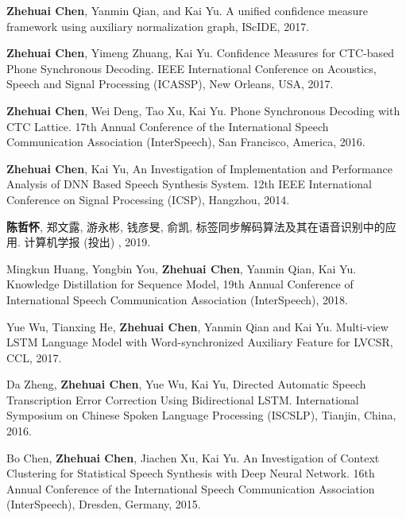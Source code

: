 \begin{publications}{99}
 \item {\bf Zhehuai Chen}, Yanmin Qian, and Kai Yu. A unified confidence measure framework using auxiliary normalization graph, IScIDE, 2017.
 \item {\bf Zhehuai Chen}, Yimeng Zhuang, Kai Yu. Confidence Measures for CTC-based Phone Synchronous Decoding. IEEE International Conference on Acoustics, Speech and Signal Processing (ICASSP), New Orleans, USA, 2017.
 \item {\bf Zhehuai Chen}, Wei Deng, Tao Xu, Kai Yu. Phone Synchronous Decoding with CTC Lattice. 17th Annual Conference of the International Speech Communication Association (InterSpeech), San Francisco, America, 2016.
 \item {\bf Zhehuai Chen}, Kai Yu, An Investigation of Implementation and Performance Analysis of DNN Based Speech Synthesis System. 12th IEEE International Conference on Signal Processing (ICSP), Hangzhou, 2014.
 \\
 \item {\bf 陈哲怀}, 郑文露, 游永彬, 钱彦旻, 俞凯, 标签同步解码算法及其在语音识别中的应用. 计算机学报 (投出) , 2019.
 \\
 \item Mingkun Huang, Yongbin You, {\bf Zhehuai Chen}, Yanmin Qian, Kai Yu. Knowledge Distillation for Sequence Model, 19th Annual Conference of  International Speech Communication Association (InterSpeech), 2018.
 \item Yue Wu, Tianxing He, {\bf Zhehuai Chen}, Yanmin Qian and Kai Yu. Multi-view LSTM Language Model with Word-synchronized Auxiliary Feature for LVCSR, CCL, 2017.
 \item Da Zheng, {\bf Zhehuai Chen}, Yue Wu, Kai Yu, Directed Automatic Speech Transcription Error Correction Using Bidirectional LSTM. International Symposium on Chinese Spoken Language Processing (ISCSLP), Tianjin, China, 2016.
 \item Bo Chen, {\bf Zhehuai Chen}, Jiachen Xu, Kai Yu. An Investigation of Context Clustering for Statistical Speech Synthesis with Deep Neural Network. 16th Annual Conference of the International Speech Communication Association (InterSpeech), Dresden, Germany, 2015.
\end{publications}

